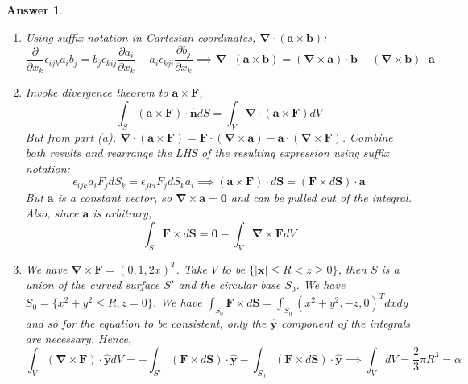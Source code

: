 \documentclass[a4paper]{article}
\newtheorem{ans}{Answer}[section]
\theoremstyle{new}
\begin{document}
\begin{ans}\leavevmode
\begin{enumerate}[label=(\alph*)]
    \item Using suffix notation in Cartesian coordinates, $\boldsymbol{\nabla}\cdot(\mathbf{a}\times\mathbf{b})$:
$$\frac{\partial}{\partial x_k}\epsilon_{ijk}a_ib_j=b_j\epsilon_{kij}\frac{\partial a_i}{\partial x_k}-a_i\epsilon_{kji}\frac{\partial b_j}{\partial x_k}\implies\boldsymbol{\nabla}\cdot(\mathbf{a}\times\mathbf{b})=(\boldsymbol{\nabla}\times\mathbf{a})\cdot\mathbf{b}-(\boldsymbol{\nabla}\times\mathbf{b})\cdot\mathbf{a}$$
\item Invoke divergence theorem to $\mathbf{a}\times\mathbf{F}$,
$$\int_S(\mathbf{a}\times\mathbf{F})\cdot\mathbf{\hat{n}}dS=\int_V\boldsymbol{\nabla}\cdot(\mathbf{a}\times\mathbf{F})dV$$
But from part (a), $\boldsymbol{\nabla}\cdot(\mathbf{a}\times\mathbf{F})=\mathbf{F}\cdot(\boldsymbol{\nabla}\times\mathbf{a})-\mathbf{a}\cdot(\boldsymbol{\nabla}\times\mathbf{F})$. Combine both results and rearrange the LHS of the resulting expression using suffix notation:
$$\epsilon_{ijk}a_iF_jdS_k=\epsilon_{jki}F_jdS_ka_i\implies(\mathbf{a}\times\mathbf{F})\cdot d\mathbf{S}=(\mathbf{F}\times d\mathbf{S})\cdot\mathbf{a}$$
But $\mathbf{a}$ is a constant vector, so $\boldsymbol{\nabla}\times\mathbf{a}=\boldsymbol{0}$ and can be pulled out of the integral. Also, since $\mathbf{a}$ is arbitrary,
$$\int_S\mathbf{F}\times d\mathbf{S}=\boldsymbol{0}-\int_V\boldsymbol{\nabla}\times\mathbf{F}dV$$
\item We have $\boldsymbol{\nabla}\times\mathbf{F}=(0,1,2x)^T$. Take $V$ to be $\{|\mathbf{x}|\leq R<z\geq 0\}$, then $S$ is a union of the curved surface $S'$ and the circular base $S_0$. We have $S_0=\{x^2+y^2\leq R,z=0\}$. We have $\int_{S_0}\mathbf{F}\times d\mathbf{S}=\int_{S_0}(x^2+y^2,-z,0)^Tdxdy$ and so for the equation to be consistent, only the $\mathbf{\hat{y}}$ component of the integrals are necessary. Hence,
$$\int_V(\boldsymbol{\nabla}\times\mathbf{F})\cdot\mathbf{\hat{y}}dV=-\int_{S'}(\mathbf{F}\times d\mathbf{S})\cdot\mathbf{\hat{y}}-\int_{S_0}(\mathbf{F}\times d\mathbf{S})\cdot\mathbf{\hat{y}}\implies \int_VdV=\frac{2}{3}\pi R^3=\alpha$$
\end{enumerate}
\end{ans}
\newpage
\end{document}

